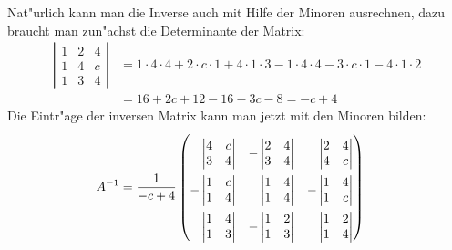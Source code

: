 \begin{loesung}
\begin{teilaufgaben}
Nat"urlich kann man die Inverse auch mit Hilfe der Minoren ausrechnen,
dazu braucht man zun"achst die Determinante der Matrix:
\begin{align*}
\left|\begin{matrix}
1&2&4\\
1&4&c\\
1&3&4
\end{matrix}\right|
&=1\cdot 4\cdot 4+2\cdot c\cdot 1+4\cdot 1\cdot 3
-1\cdot 4\cdot 4-3\cdot c\cdot 1-4\cdot 1\cdot 2
\\
&=
16+2c+12-16-3c-8
=
-c+4
\end{align*}
Die Eintr"age der inversen Matrix kann man jetzt mit den Minoren bilden:
\begin{align*}
A^{-1}
&=
\def\arraystretch{2.3}
\frac1{-c+4}\begin{pmatrix}
\def\arraystretch{1}
\phantom{-}\left|\begin{matrix}4&c\\3&4\end{matrix}\right|
	&\def\arraystretch{1}
	-\left|\begin{matrix}2&4\\3&4\end{matrix}\right|
		&\def\arraystretch{1}
		\phantom{-}\left|\begin{matrix}2&4\\4&c\end{matrix}\right|
\\
\def\arraystretch{1}
-\left|\begin{matrix}1&c\\1&4\end{matrix}\right|
	&\def\arraystretch{1}
	\phantom{-}\left|\begin{matrix}1&4\\1&4\end{matrix}\right|
		&\def\arraystretch{1}
		-\left|\begin{matrix}1&4\\1&c\end{matrix}\right|
\\
\def\arraystretch{1}
\phantom{-}\left|\begin{matrix}1&4\\1&3\end{matrix}\right|
	&\def\arraystretch{1}
	-\left|\begin{matrix}1&2\\1&3\end{matrix}\right|
		&\def\arraystretch{1}
		\phantom{-}\left|\begin{matrix}1&2\\1&4\end{matrix}\right|

\end{pmatrix}
\end{align*}
\end{teilaufgaben}
\end{loesung}
